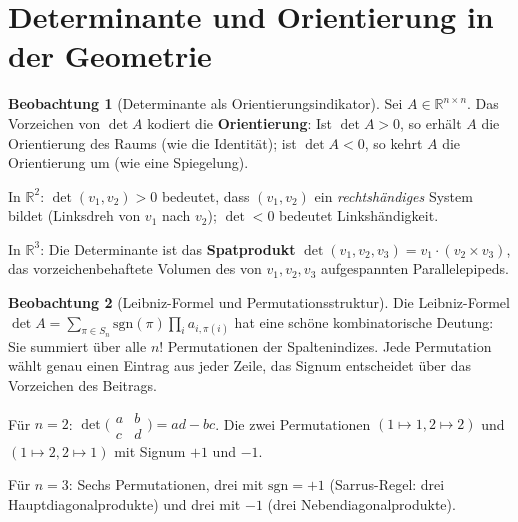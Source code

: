 ﻿\documentclass[a4paper,12pt]{report}
\theoremstyle{definition}
\newtheorem{beobachtung}{Beobachtung}
\begin{document}
\section{Determinante und Orientierung in der Geometrie}

\begin{beobachtung}[Determinante als Orientierungsindikator]
    Sei $A \in \mathbb{R}^{n \times n}$. Das Vorzeichen von $\det A$
    kodiert die \textbf{Orientierung}: Ist $\det A > 0$, so erhält
    $A$ die Orientierung des Raums (wie die Identität); ist
    $\det A < 0$, so kehrt $A$ die Orientierung um (wie eine
    Spiegelung).

    In $\mathbb{R}^2$: $\det(v_1, v_2) > 0$ bedeutet, dass $(v_1, v_2)$
    ein \emph{rechtshändiges} System bildet (Linksdreh von $v_1$ nach $v_2$);
    $\det < 0$ bedeutet Linkshändigkeit.

    In $\mathbb{R}^3$: Die Determinante ist das \textbf{Spatprodukt}
    $\det(v_1, v_2, v_3) = v_1 \cdot (v_2 \times v_3)$, das vorzeichenbehaftete
    Volumen des von $v_1, v_2, v_3$ aufgespannten Parallelepipeds.
\end{beobachtung}

\begin{beobachtung}[Leibniz-Formel und Permutationsstruktur]
    Die Leibniz-Formel $\det A = \sum_{\pi \in S_n} \mathrm{sgn}(\pi)
    \prod_i a_{i,\pi(i)}$ hat eine schöne kombinatorische Deutung:
    Sie summiert über alle $n!$ Permutationen der Spaltenindizes.
    Jede Permutation wählt genau einen Eintrag aus jeder Zeile,
    das Signum entscheidet über das Vorzeichen des Beitrags.

    Für $n = 2$: $\det\bigl(\begin{smallmatrix}a & b \\ c & d\end{smallmatrix}\bigr)
    = ad - bc$. Die zwei Permutationen $(1\mapsto 1, 2\mapsto 2)$ und
    $(1\mapsto 2, 2\mapsto 1)$ mit Signum $+1$ und $-1$.

    Für $n = 3$: Sechs Permutationen, drei mit $\mathrm{sgn} = +1$
    (Sarrus-Regel: drei Hauptdiagonalprodukte) und drei mit $-1$
    (drei Nebendiagonalprodukte).
\end{beobachtung}
\end{document}
